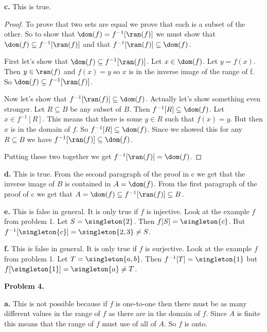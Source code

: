 \documentclass[oneside,12pt]{amsart}
\begin{document}
\textbf{c.} This is true.
\begin{proof}
To prove that two sets are equal we prove that each is a subset of the other.
So to show that $\dom(f) = f^{-1}[\ran(f)]$ we must show that
$\dom(f)\subseteq f^{-1}[\ran(f)]$ and that $f^{-1}[\ran(f)] \subseteq \dom(f)$.

First let's show that $\dom(f)\subseteq f^{-1}[\ran(f)]$. Let $x\in\dom(f)$.
Let $y=f(x)$. Then $y\in\ran(f)$ and $f(x) = y$ so $x$ is in the inverse image
of the range of f. So $\dom(f)\subseteq f^{-1}[\ran(f)]$.

Now let's show that $f^{-1}[\ran(f)] \subseteq \dom(f)$. Actually let's show
something even stronger. Let $R\subseteq B$ be any subset of $B$. Then
$f^{-1}[R] \subseteq \dom(f)$. Let $x\in f^{-1}[R]$.
This means that there is some $y\in R$ such that $f(x) = y$. But then
$x$ is in the domain of $f$. So $f^{-1}[R] \subseteq \dom(f)$. Since we showed
this for any $R\subseteq B$ we have $f^{-1}[\ran(f)] \subseteq \dom(f)$.

Putting these two together we get $f^{-1}[\ran(f)] = \dom(f)$.
\end{proof}

\textbf{d.} This is true. From the second paragraph of the proof in c we
get that the inverse image of $B$ is contained in $A = \dom(f)$. From the
first paragraph of the proof of c we get that
$A = \dom(f)\subseteq f^{-1}[\ran(f)] \subseteq B$.

\textbf{e.} This is false in general. It is only true if $f$ is injective.
Look at the example $f$ from problem 1. Let $S = \singleton{2}$. Then
$f[S] = \singleton{c}$. But $f^{-1}[\singleton{c}] = \singleton{2,3} \not= S$.


\textbf{f.} This is false in general. It is only true if $f$ is surjective.
Look at the example $f$ from problem 1. Let $T=\singleton{a,b}$. Then
$f^{-1}[T] = \singleton{1}$ but $f[\singleton{1}] = \singleton{a} \not= T$.

\medskip

\textbf{Problem 4.}

\textbf{a.} This is not possible because if $f$ is one-to-one then there must
be as many different values in the range of $f$ as there are in the domain
of $f$. Since $A$ is finite this means that the range of $f$ must use of all
of $A$. So $f$ is onto.
\end{document}
